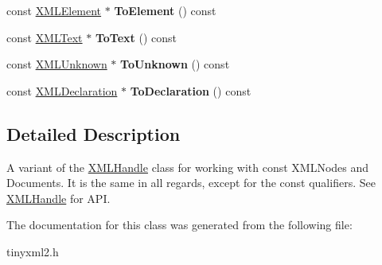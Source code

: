 \begin{DoxyCompactItemize}
\item 
\mbox{\label{classtinyxml2_1_1_x_m_l_const_handle_a4dba53c6e201d412e915620feaaa56f3}} 
const \mbox{\hyperlink{classtinyxml2_1_1_x_m_l_element}{X\+M\+L\+Element}} $\ast$ {\bfseries To\+Element} () const
\item 
\mbox{\label{classtinyxml2_1_1_x_m_l_const_handle_a80e24d90d476005aa35602a665358e2d}} 
const \mbox{\hyperlink{classtinyxml2_1_1_x_m_l_text}{X\+M\+L\+Text}} $\ast$ {\bfseries To\+Text} () const
\item 
\mbox{\label{classtinyxml2_1_1_x_m_l_const_handle_a4395e5feaba7b456a81ca274880ea3d3}} 
const \mbox{\hyperlink{classtinyxml2_1_1_x_m_l_unknown}{X\+M\+L\+Unknown}} $\ast$ {\bfseries To\+Unknown} () const
\item 
\mbox{\label{classtinyxml2_1_1_x_m_l_const_handle_a55e306d105fa80d626041e4d3b77b716}} 
const \mbox{\hyperlink{classtinyxml2_1_1_x_m_l_declaration}{X\+M\+L\+Declaration}} $\ast$ {\bfseries To\+Declaration} () const
\end{DoxyCompactItemize}


\subsection{Detailed Description}
A variant of the \mbox{\hyperlink{classtinyxml2_1_1_x_m_l_handle}{X\+M\+L\+Handle}} class for working with const X\+M\+L\+Nodes and Documents. It is the same in all regards, except for the \textquotesingle{}const\textquotesingle{} qualifiers. See \mbox{\hyperlink{classtinyxml2_1_1_x_m_l_handle}{X\+M\+L\+Handle}} for A\+PI. 

The documentation for this class was generated from the following file\+:\begin{DoxyCompactItemize}
\item 
tinyxml2.\+h\end{DoxyCompactItemize}
